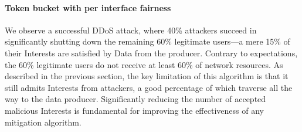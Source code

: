 %
%
%

\paragraph{\textbf{Token bucket with per interface fairness}}

We observe a successful DDoS attack, where 40\% attackers succeed in significantly shutting down the remaining 60\% legitimate users---a mere 15\% of their Interests are satisfied by Data from the producer. Contrary to expectations, the 60\% legitimate users do not receive at least 60\% of network resources. As described in the previous section, the key limitation of this algorithm is that it still admits Interests from attackers, a good percentage of which traverse all the way to the data producer. Significantly reducing the number of accepted malicious Interests is fundamental for improving the effectiveness of any mitigation algorithm. 

